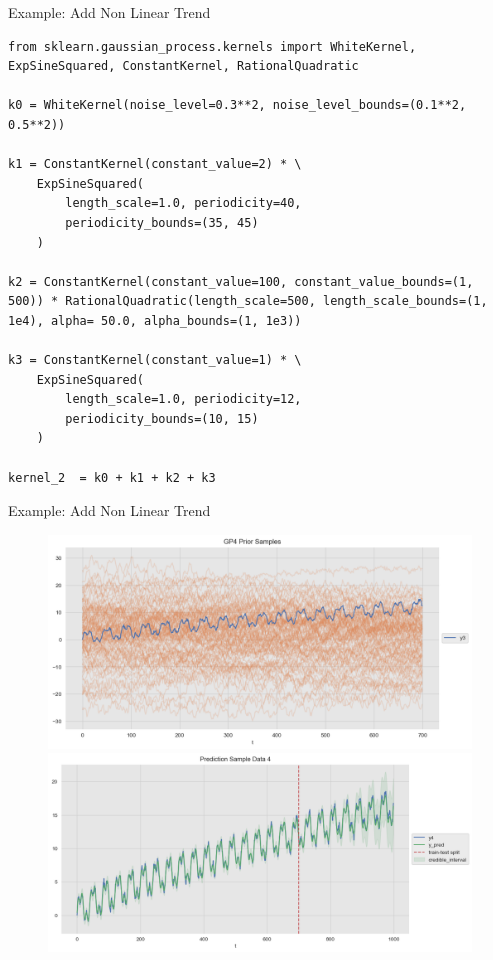 \documentclass[10pt]{beamer}
\begin{document}
\begin{frame}[fragile]{Example: Add Non Linear Trend}
\begin{lstlisting}
from sklearn.gaussian_process.kernels import WhiteKernel, ExpSineSquared, ConstantKernel, RationalQuadratic

k0 = WhiteKernel(noise_level=0.3**2, noise_level_bounds=(0.1**2, 0.5**2))

k1 = ConstantKernel(constant_value=2) * \ 
    ExpSineSquared(
        length_scale=1.0, periodicity=40, 
        periodicity_bounds=(35, 45)
    )

k2 = ConstantKernel(constant_value=100, constant_value_bounds=(1, 500)) * RationalQuadratic(length_scale=500, length_scale_bounds=(1, 1e4), alpha= 50.0, alpha_bounds=(1, 1e3))

k3 = ConstantKernel(constant_value=1) * \ 
    ExpSineSquared(
        length_scale=1.0, periodicity=12, 
        periodicity_bounds=(10, 15)
    )

kernel_2  = k0 + k1 + k2 + k3
\end{lstlisting}
\end{frame}

\begin{frame}{Example: Add Non Linear Trend}
\begin{center}
\begin{figure}
\includegraphics[scale=0.30]{images/gaussian_process_time_series_files/gaussian_process_time_series_83_0.png}
\includegraphics[scale=0.30]{images/gaussian_process_time_series_files/gaussian_process_time_series_88_0.png}
\end{figure}
\end{center}
\end{frame}
\end{document}
